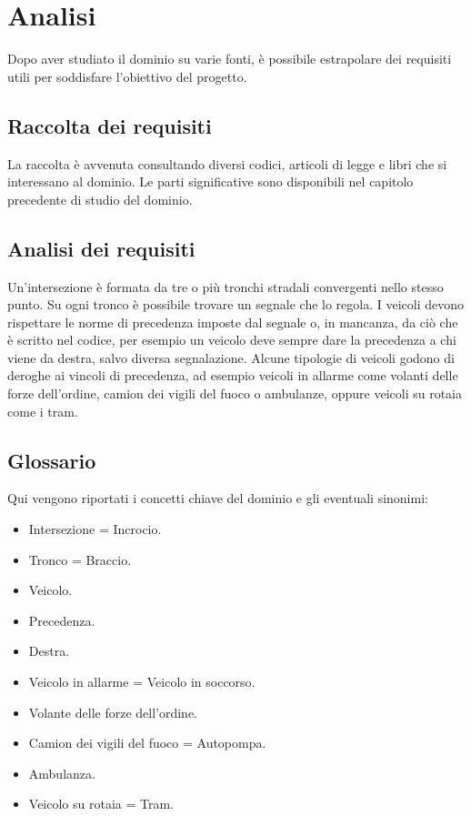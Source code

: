 \chapter{Analisi}

Dopo aver studiato il dominio su varie fonti, è possibile estrapolare dei requisiti utili per soddisfare l'obiettivo del progetto.

\section{Raccolta dei requisiti}
La raccolta è avvenuta consultando diversi codici, articoli di legge e libri che si interessano al dominio. Le parti significative sono disponibili nel capitolo precedente di studio del dominio.

\section{Analisi dei requisiti}
Un'intersezione è formata da tre o più tronchi stradali convergenti nello stesso punto. Su ogni tronco è possibile trovare un segnale che lo regola. I veicoli devono rispettare le norme di precedenza imposte dal segnale o, in mancanza, da ciò che è scritto nel codice, per esempio un veicolo deve sempre dare la precedenza a chi viene da destra, salvo diversa segnalazione. Alcune tipologie di veicoli godono di deroghe ai vincoli di precedenza, ad esempio veicoli in allarme come volanti delle forze dell'ordine, camion dei vigili del fuoco o ambulanze, oppure veicoli su rotaia come i tram.

\section{Glossario}
\label{sec:glossary}
Qui vengono riportati i concetti chiave del dominio e gli eventuali sinonimi:
\begin{itemize}
	\item Intersezione = Incrocio.
	\item Tronco = Braccio.
	\item Veicolo.
	\item Precedenza.
	\item Destra.
	\item Veicolo in allarme = Veicolo in soccorso.
	\item Volante delle forze dell'ordine.
	\item Camion dei vigili del fuoco = Autopompa.
	\item Ambulanza.
	\item Veicolo su rotaia = Tram.
\end{itemize}

